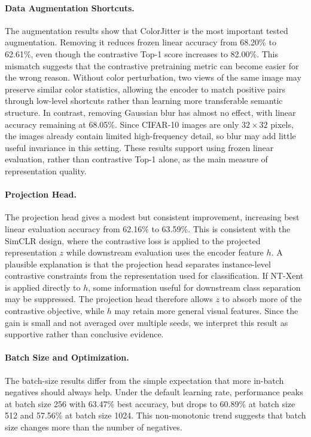 \documentclass[10pt]{article}
\begin{document}
\paragraph{Data Augmentation Shortcuts.}
The augmentation results show that ColorJitter is the most important tested augmentation. Removing it reduces frozen linear accuracy from 68.20\% to 62.61\%, even though the contrastive Top-1 score increases to 82.00\%. This mismatch suggests that the contrastive pretraining metric can become easier for the wrong reason. Without color perturbation, two views of the same image may preserve similar color statistics, allowing the encoder to match positive pairs through low-level shortcuts rather than learning more transferable semantic structure. In contrast, removing Gaussian blur has almost no effect, with linear accuracy remaining at 68.05\%. Since CIFAR-10 images are only $32 \times 32$ pixels, the images already contain limited high-frequency detail, so blur may add little useful invariance in this setting. These results support using frozen linear evaluation, rather than contrastive Top-1 alone, as the main measure of representation quality.

\paragraph{Projection Head.}
The projection head gives a modest but consistent improvement, increasing best linear evaluation accuracy from 62.16\% to 63.59\%. This is consistent with the SimCLR design, where the contrastive loss is applied to the projected representation $z$ while downstream evaluation uses the encoder feature $h$. A plausible explanation is that the projection head separates instance-level contrastive constraints from the representation used for classification. If NT-Xent is applied directly to $h$, some information useful for downstream class separation may be suppressed. The projection head therefore allows $z$ to absorb more of the contrastive objective, while $h$ may retain more general visual features. Since the gain is small and not averaged over multiple seeds, we interpret this result as supportive rather than conclusive evidence.

\paragraph{Batch Size and Optimization.}
The batch-size results differ from the simple expectation that more in-batch negatives should always help. Under the default learning rate, performance peaks at batch size 256 with 63.47\% best accuracy, but drops to 60.89\% at batch size 512 and 57.56\% at batch size 1024. This non-monotonic trend suggests that batch size changes more than the number of negatives.
\end{document}
